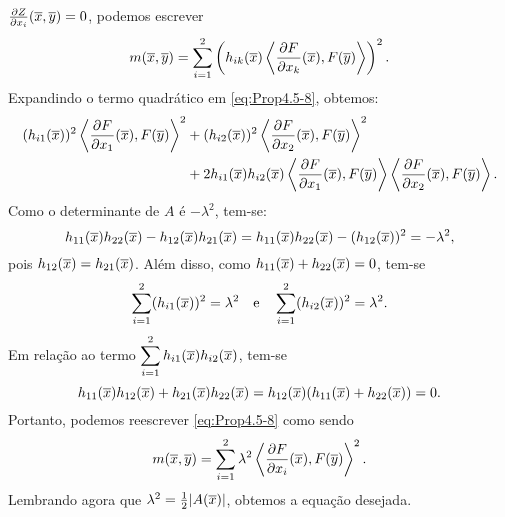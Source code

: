 \begin{demonstracao}
$\frac{\partial Z}{\partial x_i}(\overline{x},\overline{y})=0$, podemos escrever
\begin{eqnarray} \label{eq:Prop4.5-8}
m(\overline{x},\overline{y}) = \sum_{i=1}^2 \left( h_{ik}(\overline{x}) 
\left\langle \frac{\partial F}{\partial x_k}(\overline{x}), F(\overline{y}) \right\rangle \right)^2.
\end{eqnarray}	
Expandindo o termo quadr\'atico em \eqref{eq:Prop4.5-8}, obtemos:
\begin{eqnarray*}
\begin{aligned}
(h_{i1}(\overline{x}))^2 \left\langle \frac{\partial F}{\partial x_1}(\overline{x}), F(\overline{y})\right\rangle^2 
&+ 
(h_{i2}(\overline{x}))^2 \left\langle \frac{\partial F}{\partial x_2}(\overline{x}),F(\overline{y})\right\rangle^2 \\
&+ 
2 h_{i1}(\overline{x}) h_{i2}(\overline{x}) \left\langle \frac{\partial F}
{\partial x_1}(\overline{x}), F(\overline{y}) \right\rangle \left\langle 
\frac{\partial F}{\partial x_2}(\overline{x}), F(\overline{y}) \right\rangle.
\end{aligned}
\end{eqnarray*}	
Como o determinante de $A$ \'e $-\lambda^2$, tem-se:
\begin{equation*}
h_{11}(\overline{x}) h_{22}(\overline{x}) - h_{12}(\overline{x}) h_{21}(\overline{x}) = h_{11}(\overline{x}) h_{22}(\overline{x}) - (h_{12}(\overline{x}))^2 = -\lambda^2,
\end{equation*}	
pois $h_{12}(\overline{x}) = h_{21}(\overline{x})$. Al\'em disso, como 
$h_{11}(\overline{x}) + h_{22}(\overline{x}) = 0$, tem-se
\[
\sum_{i=1}^2 (h_{i1}(\overline{x}))^2 = \lambda^2 \quad\mbox{e}\quad
\sum_{i=1}^2 (h_{i2}(\overline{x}))^2 = \lambda^2.
\]
Em rela\c c\~ao ao termo $\displaystyle\sum_{i=1}^2 h_{i1}(\overline{x}) h_{i2}(\overline{x})$,
tem-se
\begin{equation*}
h_{11}(\overline{x}) h_{12}(\overline{x}) + h_{21}(\overline{x}) h_{22}(\overline{x}) = h_{12}(\overline{x}) (h_{11}(\overline{x}) + h_{22}(\overline{x})) = 0.
\end{equation*}	
Portanto, podemos reescrever \eqref{eq:Prop4.5-8} como sendo
\begin{equation*}
m(\overline{x},\overline{y}) = \sum_{i=1}^2 \lambda^2 \left\langle 
\frac{\partial F}{\partial x_i}(\overline{x}), F(\overline{y}) \right\rangle^2.
\end{equation*}	
Lembrando agora que $\lambda^2 = \frac{1}{2} |A(\overline{x})|$, obtemos
a equação desejada.
\end{demonstracao}


